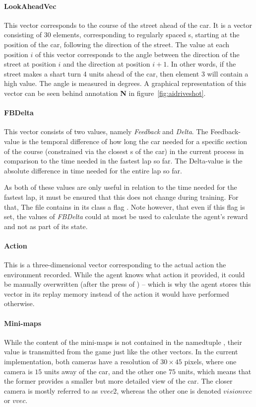 \paragraph{LookAheadVec} This vector corresponds to the course of the street ahead of the car. It is a vector consisting of 30 elements, corresponding to regularly spaced s, starting at the position of the car, following the direction of the street. The value at each position $i$ of this vector corresponds to the angle between the direction of the street at position $i$ and the direction at position $i+1$. In other words, if the street makes a shart turn 4 units ahead of the car, then element $3$ will contain a high value. The angle is measured in degrees. A graphical representation of this vector can be seen behind annotation \textbf{N} in figure~\ref{fig:aidriveshot}.

\paragraph{FBDelta} This vector consists of two values, namely \emph{Feedback} and \emph{Delta}. The Feedback-value is the temporal difference of how long the car needed for a specific section of the course (constrained via the closest s of the car) in the current process in comparison to the time needed in the fastest lap so far. The Delta-value is the absolute difference in time needed for the entire lap so far.

As both of these values are only useful in relation to the time needed for the fastest lap, it must be ensured that this does not change during training. For that, The file  contains in its class  a flag . Note however, that even if this flag is set, the values of \emph{FBDelta} could at most be used to calculate the agent's reward and not as part of its state.

\paragraph{Action} This is a three-dimensional vector corresponding to the actual action the environment recorded. While the agent knows what action it provided, it could be manually overwritten (after the press of ) -- which is why the agent stores this vector in its replay memory instead of the action it would have performed otherwise.


\paragraph{Mini-maps} While the content of the mini-maps is not contained in the namedtuple , their value is transmitted from the game just like the other vectors. In the current implementation, both cameras have a resolution of $30\times45$ pixels, where one camera is $15$ units away of the car, and the other one $75$ units, which means that the former provides a smaller but more detailed view of the car. The closer camera is mostly referred to as $vvec2$, whereas the other one is denoted $visionvec$ or $vvec$.\\

